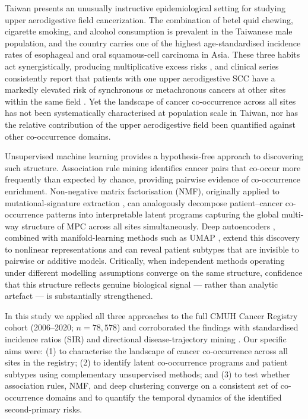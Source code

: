 \documentclass[review,12pt]{elsarticle}
\begin{document}
Taiwan presents an unusually instructive epidemiological setting for studying
upper aerodigestive field cancerization. The combination of betel quid chewing,
cigarette smoking, and alcohol consumption is prevalent in the Taiwanese male
population, and the country carries one of the highest age-standardised incidence
rates of esophageal and oral squamous-cell carcinoma in Asia. These three habits
act synergistically, producing multiplicative excess risks \cite{Lee2005}, and
clinical series consistently report that patients with one upper aerodigestive SCC
have a markedly elevated risk of synchronous or metachronous cancers at other
sites within the same field \cite{Chuang2008, Morris2011}. Yet the landscape of
cancer co-occurrence across all sites has not been systematically characterised
at population scale in Taiwan, nor has the relative contribution of the
upper aerodigestive field been quantified against other co-occurrence domains.

Unsupervised machine learning provides a hypothesis-free approach to discovering
such structure. Association rule mining \cite{Agrawal1994} identifies cancer
pairs that co-occur more frequently than expected by chance, providing pairwise
evidence of co-occurrence enrichment. Non-negative matrix factorisation (NMF),
originally applied to mutational-signature extraction \cite{Alexandrov2013,
Lee1999}, can analogously decompose patient--cancer co-occurrence patterns into
interpretable latent programs capturing the global multi-way structure of MPC
across all sites simultaneously. Deep autoencoders \cite{Hinton2006}, combined
with manifold-learning methods such as UMAP \cite{McInnes2018}, extend this
discovery to nonlinear representations and can reveal patient subtypes that are
invisible to pairwise or additive models. Critically, when independent methods
operating under different modelling assumptions converge on the same structure,
confidence that this structure reflects genuine biological signal --- rather than
analytic artefact --- is substantially strengthened.

In this study we applied all three approaches to the full CMUH Cancer Registry
cohort (2006--2020; $n = 78,578$) and corroborated the findings with
standardised incidence ratios (SIR) and directional disease-trajectory mining
\cite{Jensen2014}. Our specific aims were: (1) to characterise the landscape of
cancer co-occurrence across all sites in the registry; (2) to identify latent
co-occurrence programs and patient subtypes using complementary unsupervised
methods; and (3) to test whether association rules, NMF, and deep clustering
converge on a consistent set of co-occurrence domains and to quantify the
temporal dynamics of the identified second-primary risks.
\end{document}
